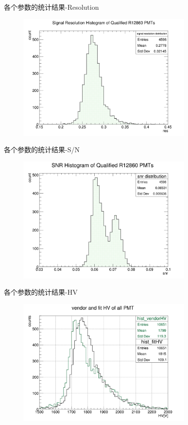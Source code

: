 \documentclass[11pt,compress,xcolor=x11names,UTF8]{beamer}
\begin{document}
\begin{frame}{各个参数的统计结果-Resolution}
\begin{figure}
\centering
\includegraphics[width=0.78\textwidth]{figures/res.png}
\end{figure}
\end{frame}
\begin{frame}{各个参数的统计结果-S/N}
\begin{figure}
\centering
\includegraphics[width=0.78\textwidth]{figures/snr.png}
\end{figure}
\end{frame}
\begin{frame}{各个参数的统计结果-HV}
\begin{figure}
\centering
\includegraphics[width=0.78\textwidth]{figures/vendorHV.png}
\end{figure}
\end{frame}
\end{document}
